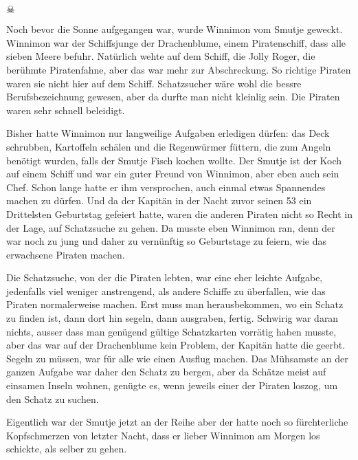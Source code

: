 \chapter*{}
\begin{center}
{\huge $\skull$}
\end{center}
Noch bevor die Sonne aufgegangen war, wurde Winnimon vom Smutje geweckt. Winnimon war der Schiffsjunge der Drachenblume, einem Piratenschiff, dass alle sieben Meere befuhr. Natürlich wehte auf dem Schiff, die Jolly Roger, die berühmte Piratenfahne, aber das war mehr zur Abschreckung. So richtige Piraten waren sie nicht hier auf dem Schiff. Schatzsucher wäre wohl die bessre Berufsbezeichnung gewesen, aber da durfte man nicht kleinlig sein. Die Piraten waren sehr schnell beleidigt.

Bisher hatte Winnimon nur langweilige Aufgaben erledigen dürfen: das Deck schrubben, Kartoffeln schälen und die Regenwürmer füttern, die zum Angeln benötigt wurden, falls der Smutje Fisch kochen wollte. Der Smutje ist der Koch auf einem Schiff und war ein guter Freund von Winnimon, aber eben auch sein Chef. Schon lange hatte er ihm versprochen, auch einmal etwas Spannendes machen zu dürfen. Und da der Kapitän in der Nacht zuvor seinen 53 ein Drittelsten Geburtstag gefeiert hatte, waren die anderen Piraten nicht so Recht in der Lage, auf Schatzsuche zu gehen. Da musste eben Winnimon ran, denn der war noch zu jung und daher zu vernünftig so Geburtstage zu feiern, wie das erwachsene Piraten machen.

Die Schatzsuche, von der die Piraten lebten, war eine eher leichte Aufgabe, jedenfalls viel weniger anstrengend, als andere Schiffe zu überfallen, wie das Piraten normalerweise machen. Erst muss man herausbekommen, wo ein Schatz zu finden ist, dann dort hin segeln, dann ausgraben, fertig. Schwirig war daran nichts, ausser dass man genügend gültige Schatzkarten vorrätig haben musste, aber das war auf der Drachenblume kein Problem, der Kapitän hatte die geerbt. Segeln zu müssen, war für alle wie einen Ausflug machen. Das Mühsamste an der ganzen Aufgabe war daher den Schatz zu bergen, aber da Schätze meist auf einsamen Inseln wohnen, genügte es, wenn jeweils einer der Piraten loszog, um den Schatz zu suchen.

Eigentlich war der Smutje jetzt an der Reihe aber der hatte noch so fürchterliche Kopfschmerzen von letzter Nacht, dass er lieber Winnimon am Morgen los schickte, als selber zu gehen.

